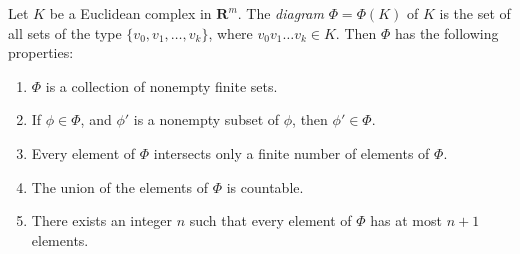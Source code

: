 Let $K$ be a Euclidean complex in $\mathbf{R}^m$. The \textit{diagram} $\Phi = \Phi(K)$ of $K$ is the set of all sets of the type $\{v_0, v_1, \ldots, v_k\}$, where $v_0 v_1 \ldots v_k \in K$. Then $\Phi$ has the following properties:
\begin{enumerate}
\item[(1)] $\Phi$ is a collection of nonempty finite sets.
\item[(2)] If $\phi \in \Phi$, and $\phi'$ is a nonempty subset of $\phi$, then $\phi' \in \Phi$.
\item[(3)] Every element of $\Phi$ intersects only a finite number of elements of $\Phi$.
\item[(4)] The union of the elements of $\Phi$ is countable.
\item[(5)] There exists an integer $n$ such that every element of $\Phi$ has at most $n+1$ elements.
\end{enumerate}
